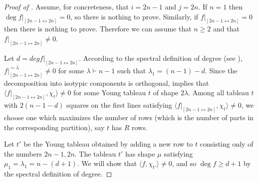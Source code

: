\documentclass[10pt,a4paper]{amsart}
\theoremstyle{definition}
\providecommand{\dcoset}[2]{[#1 \leftrightarrow #2]}
\begin{document}
\begin{proof}[Proof of ]
Assume, for concreteness, that $i=2n-1$ and $j=2n$. If $n = 1$ then $\deg f|_{\dcoset{2n-1}{2n}} = 0$, so there is nothing to prove. Similarly, if $f|_{\dcoset{2n-1}{2n}} = 0$ then there is nothing to prove. Therefore we can assume that $n \geq 2$ and that $f|_{\dcoset{2n-1}{2n}} \neq 0$.

Let $d = deg f|_{\dcoset{2n-1}{2n}}$. According to the spectral definition of degree (see ), $f|_{\dcoset{2n-1}{2n}}^{=\lambda} \neq 0$ for some $\lambda \vdash n-1$ such that $\lambda_1 = (n-1)-d$. Since the decomposition into isotypic components is orthogonal,  implies that $\langle f|_{\dcoset{2n-1}{2n}}, \chi_t \rangle \neq 0$ for some Young tableau $t$ of shape $2\lambda$. Among all tableau $t$ with $2(n-1-d)$ squares on the first lines satisfying $\langle f|_{\dcoset{2n-1}{2n}}, \chi_t \rangle \neq 0$, we choose one which maximizes the number of rows (which is the number of parts in the corresponding partition), say $t$ has $R$ rows.

Let $t'$ be the Young tableau obtained by adding a new row to $t$ consisting only of the numbers $2n-1,2n$. The tableau $t'$ has shape $\mu$ satisfying $\mu_1 = \lambda_1 = n - (d+1)$. We will show that $\langle f, \chi_{t'} \rangle \neq 0$, and so $\deg f \geq d+1$ by the spectral definition of degree.


\end{proof}
\end{document}
